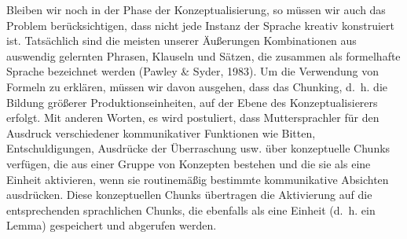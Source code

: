 \documentclass[
  letterpaper,
]{scrbook}
\begin{document}
Bleiben wir noch in der Phase der Konzeptualisierung, so müssen wir auch
das Problem berücksichtigen, dass nicht jede Instanz der Sprache kreativ
konstruiert ist. Tatsächlich sind die meisten unserer Äußerungen
Kombinationen aus auswendig gelernten Phrasen, Klauseln und Sätzen, die
zusammen als formelhafte Sprache bezeichnet werden (Pawley \& Syder,
1983). Um die Verwendung von Formeln zu erklären, müssen wir davon
ausgehen, dass das Chunking, d.~h. die Bildung größerer
Produktionseinheiten, auf der Ebene des Konzeptualisierers erfolgt. Mit
anderen Worten, es wird postuliert, dass Muttersprachler für den
Ausdruck verschiedener kommunikativer Funktionen wie Bitten,
Entschuldigungen, Ausdrücke der Überraschung usw. über konzeptuelle
Chunks verfügen, die aus einer Gruppe von Konzepten bestehen und die sie
als eine Einheit aktivieren, wenn sie routinemäßig bestimmte
kommunikative Absichten ausdrücken. Diese konzeptuellen Chunks
übertragen die Aktivierung auf die entsprechenden sprachlichen Chunks,
die ebenfalls als eine Einheit (d.~h. ein Lemma) gespeichert und
abgerufen werden.
\end{document}
